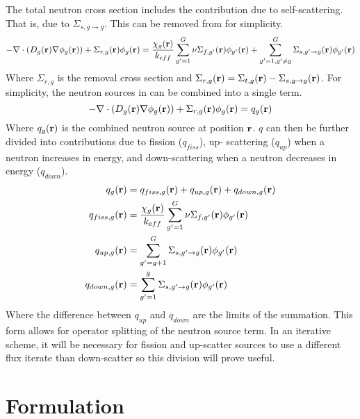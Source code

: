   The total neutron cross section includes the contribution due to 
  self-scattering. That is, due to $\Sigma_{s,g\rightarrow g}$. This can be 
  removed from  for simplicity.
  \begin{equation} \label{eq:multigroup_removal}
    - \mathbf{\nabla} \cdot( D_g(\mathbf{r}) \mathbf{\nabla} \phi_g(\mathbf{r})) + \Sigma_{r,g}(\mathbf{r}) \phi_g(\mathbf{r}) = 
      \frac{\chi_g(\mathbf{r})}{k_{eff}} \sum_{g'=1}^{G} \nu\Sigma_{f,g'}(\mathbf{r}) 
      \phi_{g'}(\mathbf{r}) + \sum_{g'=1, g' \ne g}^{G} \Sigma_{s,g' \rightarrow g}(\mathbf{r}) 
      \phi_{g'}(\mathbf{r})
  \end{equation}
  Where $\Sigma_{r,g}$ is the removal cross section and $\Sigma_{r,g}(\mathbf{r}) = 
  \Sigma_{t,g}(\mathbf{r}) - \Sigma_{s,g\rightarrow g}(\mathbf{r})$. For simplicity, the
  neutron sources in  can be  combined into a
  single term.
  \begin{equation} \label{eq:multigroup_source}
    - \mathbf{\nabla} \cdot( D_g(\mathbf{r}) \mathbf{\nabla} \phi_g(\mathbf{r})) + \Sigma_{r,g}(\mathbf{r}) \phi_g(\mathbf{r}) = 
      q_g(\mathbf{r})
  \end{equation}
  Where $q_g(\mathbf{r})$ is the combined neutron source at position $\mathbf{r}$. $q$ can 
  then be further divided into contributions due to fission ($q_{fiss}$), 
  up- scattering ($q_{up}$) when a neutron increases in energy, and 
  down-scattering when a neutron decreases in energy ($q_{down}$).
  \begin{align}
    q_g(\mathbf{r}) &= q_{fiss,g}(\mathbf{r}) + q_{up,g}(\mathbf{r}) + q_{down,g}(\mathbf{r}) \\
    q_{fiss,g}(\mathbf{r}) &= \frac{\chi_g(\mathbf{r})}{k_{eff}} \sum_{g'=1}^{G} 
      \nu \Sigma_{f,g'}(\mathbf{r}) \phi_{g'}(\mathbf{r}) \\
    q_{up,g}(\mathbf{r}) &= \sum_{g'=g+1}^{G} \Sigma_{s,g' \rightarrow g}(\mathbf{r})
      \phi_{g'}(\mathbf{r}) \\
    q_{down,g}(\mathbf{r}) &= \sum_{g'=1}^{g} \Sigma_{s,g' \rightarrow g}(\mathbf{r})
      \phi_{g'}(\mathbf{r})
  \end{align}
  Where the difference between $q_{up}$ and $q_{down}$ are the limits of the 
  summation. This form allows for operator splitting of the neutron source term.
  In an iterative scheme, it will be necessary for fission and up-scatter 
  sources to use a different flux iterate than down-scatter so this division
  will prove useful.
  

\section{Formulation}
